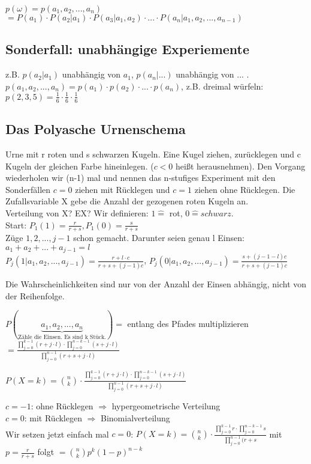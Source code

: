$p(\omega) = p(a_1, a_2, ..., a_n)$ 
$= P(a_1) \cdot P(a_2 | a_1) \cdot P(a_3 | a_1,a_2) \cdot ... \cdot P(a_n | a_1,a_2,...,a_{n-1})$

\subsection{Sonderfall: unabhängige Experiemente}
z.B. $p(a_2|a_1)$ unabhängig von $a_1$, $p(a_n | ... )$ unabhängig von ... .
$p(a_1,a_2,...,a_n) = p(a_1) \cdot p(a_2) \cdot ... \cdot p(a_n)$, z.B. dreimal würfeln: 
$p(2,3,5) = \frac{1}{6} \cdot \frac{1}{6} \cdot \frac{1}{6}$

\subsection{Das Polyasche Urnenschema}
Urne mit r roten und s schwarzen Kugeln. Eine Kugel ziehen, zurücklegen und c Kugeln der gleichen Farbe hineinlegen. ($c<0$ heißt herausnehmen). Den Vorgang wiederholen wir (n-1) mal und nennen das n-stufiges Experiment mit den Sonderfällen $c=0$ ziehen mit Rücklegen und $c=1$ ziehen ohne Rücklegen. Die Zufallsvariable X gebe die Anzahl der gezogenen roten Kugeln an. \\

Verteilung von X? EX? Wir definieren: $ 1 \widehat{=}$ rot, $0 \widehat{=} schwarz$.\\
Start: $P_1(1) = \frac{r}{r+s}, P_1(0) = \frac{s}{r+s}$\\
Züge $1, 2, ..., j-1$ schon gemacht. Darunter seien genau l Einsen: $ a_1 + a_2 + ... + a_{j-1} = l$\\
$P_j(1|a_1,a_2,...,a_{j-1}) = \frac{r + l \cdot c}{r+s+(j-1)c}$, 
$P_j(0|a_1,a_2,...,a_{j-1}) = \frac{s + (j-1-l)c}{r+s+(j-1)c}$

Die Wahrscheinlichkeiten sind nur von der Anzahl der Einsen abhängig, nicht von der Reihenfolge.

$P(\underbrace{a_1, a_2, ..., a_n}_{\textrm{Zähle die Einsen. Es sind k Stück.}}) =$ entlang des Pfades multiplizieren
$= \frac{\prod_{j=0}^{k-1} (r+j \cdot l ) \cdot \prod_{j=0}^{n-k-1} (s+j \cdot l)}{\prod_{j=0}^{n-1} (r+s+j\cdot l)}$

$P(X=k) = \binom n k \cdot \frac{\prod_{j=0}^{k-1} (r+j \cdot l ) \cdot \prod_{j=0}^{n-k-1} (s+j \cdot l)}{\prod_{j=0}^{n-1} (r+s+j\cdot l)}$

$c=-1$: ohne Rücklegen $\Rightarrow$ hypergeometrische Verteilung\\
$c=0$: mit Rücklegen $\Rightarrow$ Binomialverteilung\\

Wir setzen jetzt einfach mal $c=0$: 
$P(X=k) = \binom n k \cdot \frac{\prod_{j=0}^{k-1} r \cdot \prod_{j=0}^{n-k-1} s}{\prod_{j=0}^{n-1} (r+s}$
mit $p=\frac{r}{r+s}$ folgt 
$= \binom n k p^k (1-p)^{n-k}$